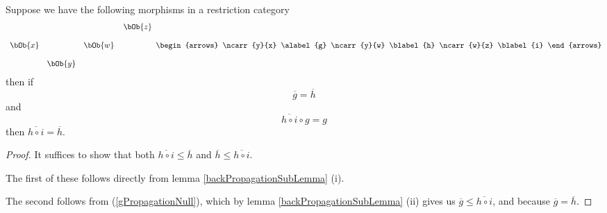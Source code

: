 \begin{lemma}
Suppose we have the following morphisms in a restriction category
\[
\begin{array} {c c c c c}
       &        &        &         &\kern-0.3cm\bOb{z}  \\[0.4cm]
\bOb{x}&        &\bOb{w}                     \\[0.4cm]
       & \bOb{y} 
\end{array}
\begin{arrows}
\ncarr{y}{x} \alabel{g}
\ncarr{y}{w} \blabel{h}
\ncarr{w}{z} \blabel{i}
\end{arrows}
\]
then if 
\begin{equation}
\label{ghTight}
\overline{g}=\overline{h}
 \end{equation}
 and 
 \begin{equation}
 \label{gPropagationNull}
 \overline{h \circ i} \circ g = g
 \end{equation}
 then
$\overline{h \circ i} = \overline{h}$. 
\end{lemma}
\begin{proof}
It suffices to show that both $\overline{h \circ i} \leq \overline{h}$
and $\overline{h} \leq \overline{h \circ i}$.

The first of these 
follows directly from lemma \ref{backPropagationSubLemma} (i).

The second follows from (\ref{gPropagationNull}), 
which by lemma \ref{backPropagationSubLemma} (ii)
gives us
$\overline{g} \leq \overline{h \circ i}$, and because $\overline{g} = \overline{h}$.
\end{proof}